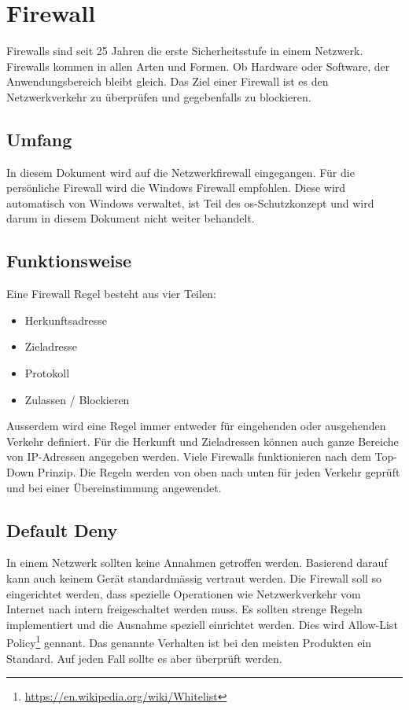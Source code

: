 \chapter{Firewall}
Firewalls sind seit 25 Jahren die erste Sicherheitsstufe in einem Netzwerk.
Firewalls kommen in allen Arten und Formen.
Ob Hardware oder Software, der Anwendungsbereich bleibt gleich.
Das Ziel einer Firewall ist es den Netzwerkverkehr zu überprüfen und gegebenfalls zu blockieren.


\section{Umfang}
In diesem Dokument wird auf die Netzwerkfirewall eingegangen.
Für die persönliche Firewall wird die Windows Firewall empfohlen.
Diese wird automatisch von Windows verwaltet, ist Teil des \acrshort{os}-Schutzkonzept und wird darum in diesem Dokument nicht weiter behandelt.

\section{Funktionsweise}
Eine Firewall Regel besteht aus vier Teilen:
\begin{itemize}
    \item Herkunftsadresse
    \item Zieladresse
    \item Protokoll
    \item Zulassen / Blockieren
\end{itemize}

Ausserdem wird eine Regel immer entweder für eingehenden oder ausgehenden Verkehr definiert.
Für die Herkunft und Zieladressen können auch ganze Bereiche von IP-Adressen angegeben werden.
Viele Firewalls funktionieren nach dem Top-Down Prinzip. 
Die Regeln werden von oben nach unten für jeden Verkehr geprüft und bei einer Übereinstimmung angewendet.

\section{Default Deny}
In einem Netzwerk sollten keine Annahmen getroffen werden.
Basierend darauf kann auch keinem Gerät standardmässig vertraut werden.
Die Firewall soll so eingerichtet werden, dass spezielle Operationen wie Netzwerkverkehr vom Internet nach intern freigeschaltet werden muss.
Es sollten strenge Regeln implementiert und die Ausnahme speziell einrichtet werden.
Dies wird Allow-List Policy\footnote{\href{https://en.wikipedia.org/wiki/Whitelist}{https://en.wikipedia.org/wiki/Whitelist}} gennant.
Das genannte Verhalten ist bei den meisten Produkten ein Standard.
Auf jeden Fall sollte es aber überprüft werden.\\

